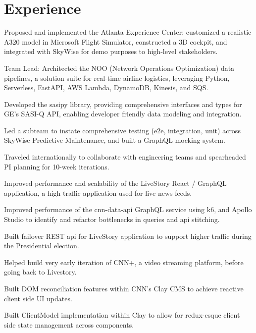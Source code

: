 \documentclass[]{pb-resume-openfonts}
\begin{document}
\begin{minipage}[t]{0.66\textwidth} 

\section{Experience}
\vspace{\topsep} %
\begin{tightemize}

\item Proposed and implemented the Atlanta Experience Center: customized a realistic A320 model in Microsoft Flight Simulator, constructed a 3D cockpit, and integrated with SkyWise for demo purposes to high-level stakeholders.
\item Team Lead: Architected the NOO (Network Operations Optimization) data pipelines, a solution suite for real-time airline logistics, leveraging Python, Serverless, FastAPI, AWS Lambda, DynamoDB, Kinesis, and SQS.
\item Developed the sasipy library, providing comprehensive interfaces and types for GE's SASI-Q API, enabling developer friendly data modeling and integration.
\item Led a subteam to instate comprehensive testing (e2e, integration, unit) across SkyWise Predictive Maintenance, and built a GraphQL mocking system.
\item Traveled internationally to collaborate with engineering teams and spearheaded PI planning for 10-week iterations.

\end{tightemize}
\sectionsep

\vspace{\topsep} %
\begin{tightemize}
\item Improved performance and scalability of the LiveStory React / GraphQL application, a high-traffic application used for live news feeds.
\item Improved performance of the cnn-data-api GraphQL service using k6, and Apollo Studio to identify and refactor bottlenecks in queries and api stitching.
\item Built failover REST api for LiveStory application to support higher traffic during the Presidential election.
\item Helped build very early iteration of CNN+, a video streaming platform, before going back to Livestory. 
\item Built DOM reconciliation features within CNN's Clay CMS to achieve reactive client side UI updates.
\item Built ClientModel implementation within Clay to allow for redux-esque client side state management across components.
\end{tightemize}
\sectionsep



\end{minipage}
\end{document}
